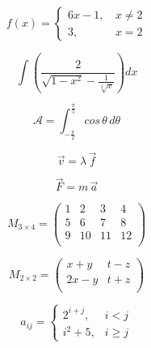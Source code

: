 \documentclass[12pt]{article}
\begin{document}
\begin{equation}
	f(x) = \left\{
	\begin{array}{cc}
		6x-1, \, & x \neq 2 \\
		3, \quad & x = 2
	\end{array}
	\right.
\end{equation}

\begin{equation}
	\int \left(\frac{2}{\sqrt{1 - x^2} - \frac{1}{\sqrt[4]{x}}}\right)dx
\end{equation}

\begin{equation}
	\mathcal{A} = \int_{-\frac{\pi}{2}}^{\frac{\pi}{5}} cos \, \theta \, d\theta
\end{equation}

\begin{equation}
	\vec{v}= \lambda \, \vec{f}
\end{equation}

\begin{equation}
	\vec{F} = m \, \vec{a}
\end{equation}

\begin{equation}
	M_{3 \times 4}= \left(
	\begin{array}{lrlr}
		1 & 2 & 3 & 4 \\
		5 & 6 & 7 & 8 \\
		9 & 10& 11&12 \\
	\end{array}\right)
\end{equation}

\begin{equation}
	M_{2 \times 2}= \left(
	\begin{array}{lrlr}
		x + y & t - z \\
		2x - y & t+z \\
	\end{array}\right)
\end{equation}

\begin{equation}
	a_{ij} = \left\{
	\begin{array}{cc}
		2^{i + j}, & i < j \\
		i^2 + 5, & i \geq j
	\end{array}\right.
\end{equation}
\end{document}

